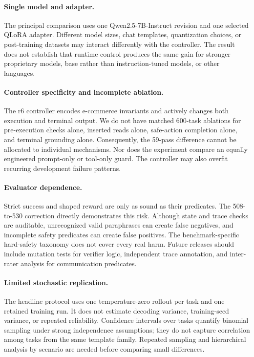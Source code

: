 \documentclass[11pt]{article}
\begin{document}
\paragraph{Single model and adapter.}
The principal comparison uses one Qwen2.5-7B-Instruct revision and one selected QLoRA adapter. Different model sizes, chat templates, quantization choices, or post-training datasets may interact differently with the controller. The result does not establish that runtime control produces the same gain for stronger proprietary models, base rather than instruction-tuned models, or other languages.

\paragraph{Controller specificity and incomplete ablation.}
The r6 controller encodes e-commerce invariants and actively changes both execution and terminal output. We do not have matched 600-task ablations for pre-execution checks alone, inserted reads alone, safe-action completion alone, and terminal grounding alone. Consequently, the 59-pass difference cannot be allocated to individual mechanisms. Nor does the experiment compare an equally engineered prompt-only or tool-only guard. The controller may also overfit recurring development failure patterns.

\paragraph{Evaluator dependence.}
Strict success and shaped reward are only as sound as their predicates. The 508-to-530 correction directly demonstrates this risk. Although state and trace checks are auditable, unrecognized valid paraphrases can create false negatives, and incomplete safety predicates can create false positives. The benchmark-specific hard-safety taxonomy does not cover every real harm. Future releases should include mutation tests for verifier logic, independent trace annotation, and inter-rater analysis for communication predicates.

\paragraph{Limited stochastic replication.}
The headline protocol uses one temperature-zero rollout per task and one retained training run. It does not estimate decoding variance, training-seed variance, or repeated reliability. Confidence intervals over tasks quantify binomial sampling under strong independence assumptions; they do not capture correlation among tasks from the same template family. Repeated sampling and hierarchical analysis by scenario are needed before comparing small differences.
\end{document}
